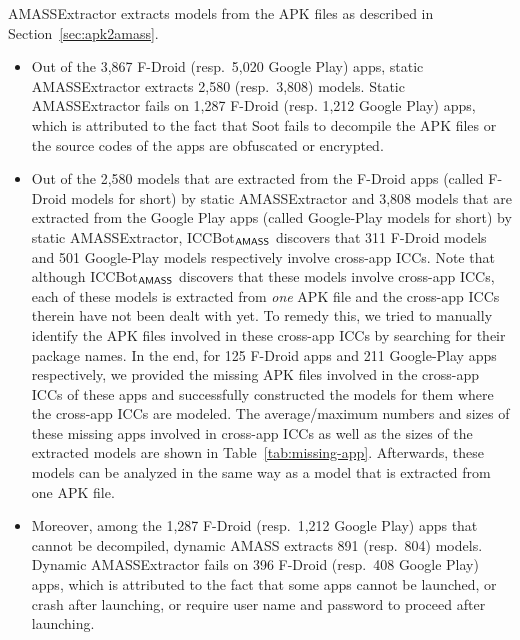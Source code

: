 {\sf AMASSExtractor} extracts {\AMASS} models from the APK files as described in Section~\ref{sec:apk2amass}. 
\begin{itemize}
\item Out of the 3,867 F-Droid (resp.\ 5,020 Google Play) apps, static {\sf AMASSExtractor} extracts 2,580 (resp.\ 3,808) {\AMASS} models. Static {\sf AMASSExtractor} fails on 1,287 F-Droid (resp. 1,212 Google Play) apps, which is attributed to the fact that Soot fails to decompile the APK files or the source codes of the apps are obfuscated or encrypted. 

\item Out of the 2,580 models that are extracted from the F-Droid apps (called F-Droid models for short) by static {\sf AMASSExtractor} and 3,808 models that are extracted from the Google Play apps  (called Google-Play models for short) by static {\sf AMASSExtractor}, ICCBot$_{\textsf{AMASS}}$ discovers that 311 F-Droid models and 501 Google-Play models respectively involve cross-app ICCs. 
Note that although ICCBot$_{\textsf{AMASS}}$ discovers that these models involve cross-app ICCs, each of these models is extracted from \emph{one} APK file and the cross-app ICCs therein have not been dealt with yet. 
To remedy this, we tried to manually identify the APK files involved in these cross-app ICCs by searching for their package names. In the end, for 125 F-Droid apps and 211 Google-Play apps respectively, we provided the missing APK files involved in the cross-app ICCs of these apps and successfully constructed the {\AMASS} models for them where the cross-app ICCs are modeled. The average/maximum numbers and sizes of these missing apps involved in cross-app ICCs as well as the sizes of the extracted models are shown in Table~\ref{tab:missing-app}. Afterwards, these models can be analyzed in the same way as a model that is extracted from one APK file.
%
\item Moreover, among the 1,287 F-Droid (resp.\ 1,212 Google Play) apps that cannot be decompiled, dynamic {\sf AMASS} extracts 891 (resp.\ 804) {\AMASS} models. Dynamic {\sf AMASSExtractor} fails on 396 F-Droid (resp.\ 408 Google Play) apps, which is attributed to the fact that some apps cannot be launched, or crash after launching, or require user name and password to proceed after launching.  
\end{itemize}


